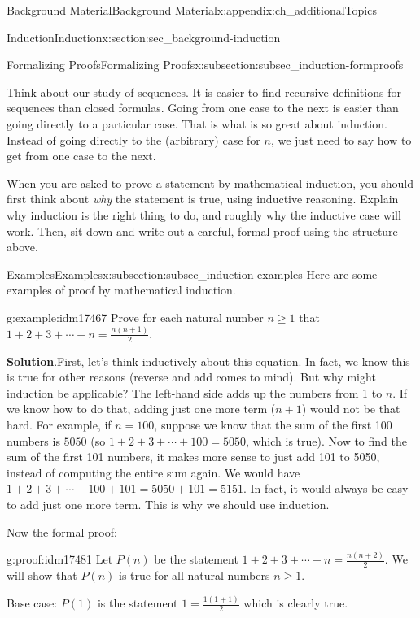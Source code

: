 \documentclass[oneside,10pt,]{book}
\numberwithin{equation}{chapter}
\begin{document}
\begin{appendixptx}{Background Material}{}{Background Material}{}{}{x:appendix:ch_additionalTopics}
\begin{sectionptx}{Induction}{}{Induction}{}{}{x:section:sec_background-induction}
\begin{subsectionptx}{Formalizing Proofs}{}{Formalizing Proofs}{}{}{x:subsection:subsec_induction-formproofs}
\par
Think about our study of sequences. It is easier to find recursive definitions for sequences than closed formulas. Going from one case to the next is easier than going directly to a particular case. That is what is so great about induction. Instead of going directly to the (arbitrary) case for \(n\), we just need to say how to get from one case to the next.%
\par
When you are asked to prove a statement by mathematical induction, you should first think about \emph{why} the statement is true, using inductive reasoning. Explain why induction is the right thing to do, and roughly why the inductive case will work. Then, sit down and write out a careful, formal proof using the structure above.%
\end{subsectionptx}
%
%
\typeout{************************************************}
\typeout{************************************************}
%
\begin{subsectionptx}{Examples}{}{Examples}{}{}{x:subsection:subsec_induction-examples}
Here are some examples of proof by mathematical induction.%
\begin{example}{}{g:example:idm17467}%
Prove for each natural number \(n \ge 1\) that \(1 + 2 + 3 + \cdots + n = \frac{n(n+1)}{2}\).%
\par\smallskip%
\noindent\textbf{Solution}.\hypertarget{g:solution:idm17472}{}\quad{}First, let's think inductively about this equation. In fact, we know this is true for other reasons (reverse and add comes to mind). But why might induction be applicable? The left-hand side adds up the numbers from 1 to \(n\). If we know how to do that, adding just one more term (\(n+1\)) would not be that hard. For example, if \(n = 100\), suppose we know that the sum of the first 100 numbers is \(5050\) (so \(1 + 2 + 3 + \cdots + 100 = 5050\), which is true). Now to find the sum of the first 101 numbers, it makes more sense to just add 101 to 5050, instead of computing the entire sum again. We would have \(1 + 2 + 3 + \cdots + 100 + 101 = 5050 + 101 = 5151\). In fact, it would always be easy to add just one more term. This is why we should use induction.%
\par
Now the formal proof:%
\begin{proofptx}{}{g:proof:idm17481}
Let \(P(n)\) be the statement \(1 + 2 + 3 + \cdots + n = \frac{n(n+2)}{2}\). We will show that \(P(n)\) is true for all natural numbers \(n \ge 1\).%
\par
Base case: \(P(1)\) is the statement \(1 = \frac{1(1+1)}{2}\) which is clearly true.%

\end{proofptx}
\end{example}
\end{subsectionptx}
\end{sectionptx}
\end{appendixptx}
\end{document}
